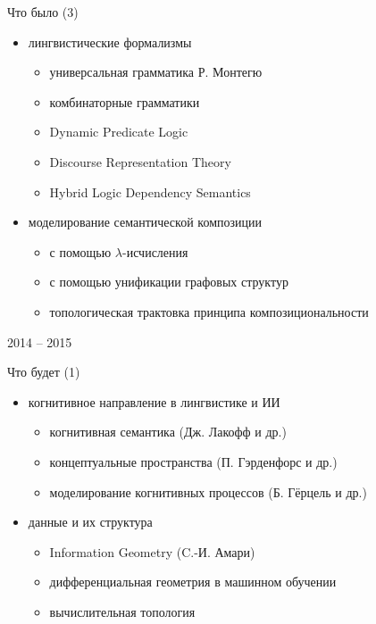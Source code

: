 \documentclass{beamer}
\begin{document}
\begin{frame}{Что было (3)}
\begin{small}
\begin{itemize}
    \item лингвистические формализмы
    \begin{itemize}
        \item универсальная грамматика Р. Монтегю
        \item комбинаторные грамматики
        \item Dynamic Predicate Logic 
        \item Discourse Representation Theory
        \item Hybrid Logic Dependency Semantics
    \end{itemize}
    \item моделирование семантической композиции
    \begin{itemize}
        \item с помощью $\lambda$-исчисления
        \item с помощью унификации графовых структур
        \item топологическая трактовка принципа композициональности
    \end{itemize}
\end{itemize}
\end{small}
\end{frame}

\begin{frame}{}
\begin{center}
2014 -- 2015
\end{center}
\end{frame}

\begin{frame}{Что будет (1)}
\begin{small}
\begin{itemize}
    \item когнитивное направление в лингвистике и ИИ
    \begin{itemize}
        \item когнитивная семантика (Дж. Лакофф и др.)
        \item концептуальные пространства (П. Гэрденфорс и др.)
        \item моделирование когнитивных процессов (Б. Гёрцель и др.)
    \end{itemize}
	\item данные и их структура
	\begin{itemize}
    	\item Information Geometry (C.-И. Амари)
    	\item дифференциальная геометрия в машинном обучении
    	\item вычислительная топология
	\end{itemize}
\end{itemize}
\end{small}
\end{frame}
\end{document}
